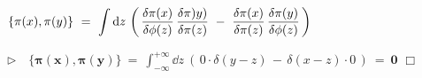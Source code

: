 $\displaystyle \{\pi(x),\pi(y)\} \ = \ \int \dd z \, \left( \, \fdv{\pi(x)}{\phi(z)} \, \fdv{\pi)y)}{\pi(z)} \ - \ \fdv{\pi(x)}{\pi(z)}\, \fdv{\pi(y)}{\phi(z)} \, \right)$


$\triangleright \quad  \displaystyle \boldsymbol{ \{\pi(x),\pi(y)\} \ }= \ \int_{-\infty}^{+\infty} \dd z \ \left ( \, 0 \cdot \delta(y-z) \, - \, \delta(x-z) \cdot 0 \, \right) \ = \ \boldsymbol{0}$ \hspace{6cm} $\Box$

\color{black}
















